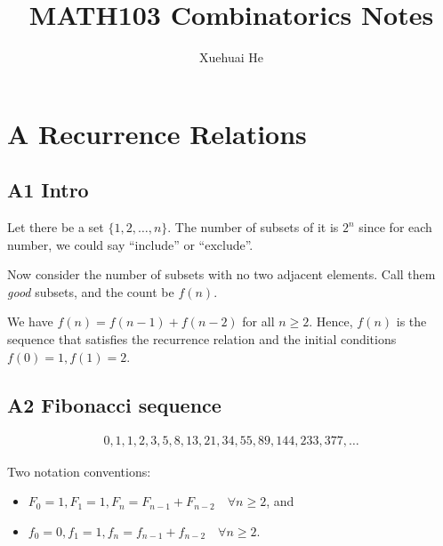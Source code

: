 \documentclass[12pt]{article}
\begin{document}
\title{MATH103 Combinatorics Notes}
\author{Xuehuai He}
\maketitle

\hypertarget{toc}{}
{\parskip=0.05in
\tableofcontents}


\newpage
\pagestyle{updated}
\section{A Recurrence Relations}
\subsection{A1 Intro}
\rmk Let there be a set $\{1,2,\dots,n\}$. The number of subsets of it is $2^n$ since for each number, we could say ``include'' or ``exclude''.

\eg Now consider the number of subsets with no two adjacent elements. Call them \textit{good} subsets, and the count be $f(n)$.


We have $f(n)=f(n-1)+f(n-2)$ for all $n\geq 2$. Hence, $f(n)$ is the sequence that satisfies the recurrence relation and the initial conditions $f(0)=1, f(1)=2$.

\subsection{A2 Fibonacci sequence}
\begin{align*}
    0,1,1,2,3,5,8,13,21,34,55,89,144,233,377,\dots
\end{align*}

\rmk Two notation conventions: \begin{itemize}
    \item $F_0=1, F_1=1, F_n=F_{n-1}+F_{n-2}\quad \forall n\geq 2$, and
    \item $f_0=0, f_1=1, f_n=f_{n-1}+f_{n-2}\quad \forall n\geq 2$.
\end{itemize}
\end{document}
